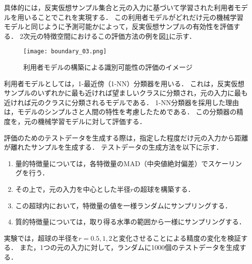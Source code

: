 \documentclass[dvipdfmx]{jreport}
\begin{document}
具体的には，反実仮想サンプル集合と元の入力に基づいて学習された利用者モデルを用いることでこれを実現する．
この利用者モデルがどれだけ元の機械学習モデルと同じように予測可能かによって，反実仮想サンプルの有効性を評価する．
2次元の特徴空間におけるこの評価方法の例を図\ref{fig:boundary}に示す．

\begin{figure}[h]
    \begin{center}
        \texttt{[image: boundary\_03.png]} 
        \caption{利用者モデルの構築による識別可能性の評価のイメージ} \label{fig:boundary}
    \end{center}
\end{figure}

\newpage

利用者モデルとしては，1-最近傍（1-NN）分類器を用いる．
これは，反実仮想サンプルのいずれかに最も近ければ望ましいクラスに分類され，元の入力に最も近ければ元のクラスに分類されるモデルである．
1-NN分類器を採用した理由は，モデルのシンプルさと人間の特性を考慮したためである．
この分類器の精度を，元の機械学習モデルに対して評価する．

評価のためのテストデータを生成する際は，指定した程度だけ元の入力から距離が離れたサンプルを生成する．
テストデータの生成方法を以下に示す．
\begin{tcolorbox}[title=\textbf{利用者モデル用テストデータの生成}]
    \begin{enumerate}
        \item 量的特徴量については，各特徴量のMAD（中央値絶対偏差）でスケーリングを行う．
        \item その上で，元の入力を中心とした半径$r$の超球を構築する．
        \item この超球内において，特徴量の値を一様ランダムにサンプリングする．
        \item 質的特徴量については，取り得る水準の範囲から一様にサンプリングする．
    \end{enumerate}
\end{tcolorbox}

実験では，超球の半径を$r={0.5,1,2}$と変化させることによる精度の変化を検証する．
また，1つの元の入力に対して，ランダムに1000個のテストデータを生成する．
\end{document}
